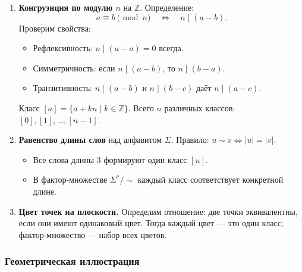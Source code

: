 \begin{enumerate}[label=\arabic*)]
  \item \textbf{Конгруэнция по модулю $n$} на $\mathbb{Z}$.  
    Определение: 
    \[
      a \equiv b \pmod{n}
      \quad\Longleftrightarrow\quad
      n \mid (a-b).
    \]
    Проверим свойства:
    \begin{itemize}[leftmargin=*]
      \item Рефлексивность: $n\mid(a-a)=0$ всегда.
      \item Симметричность: если $n\mid(a-b)$, то $n\mid(b-a)$.
      \item Транзитивность: $n\mid(a-b)$ и $n\mid(b-c)$ даёт $n\mid(a-c)$.
    \end{itemize}
    Класс $[a]=\{a+kn \mid k\in\mathbb{Z}\}$.  
    Всего $n$ различных классов: $[0], [1],\dots,[n-1]$.

  \item \textbf{Равенство длины слов} над алфавитом $\Sigma$.  
    Правило: $u\sim v \iff |u|=|v|$.  
    \begin{itemize}[leftmargin=*]
      \item Все слова длины 3 формируют один класс $[u]$.
      \item В фактор‑множестве $\Sigma^*/{\sim}$ каждый класс соответствует конкретной длине.
    \end{itemize}

  \item \textbf{Цвет точек на плоскости.}  
    Определим отношение: две точки эквивалентны, если они имеют одинаковый цвет.  
    Тогда каждый цвет — это один класс; фактор‑множество — набор всех цветов.
\end{enumerate}

\subsubsection{Геометрическая иллюстрация}

\begin{center}
\end{center}

